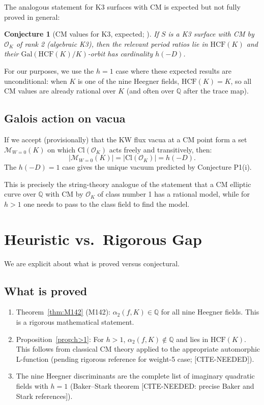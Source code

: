 \documentclass[12pt,a4paper]{article}
\theoremstyle{plain}
\newtheorem{conjecture}[theorem]{Conjecture}
\theoremstyle{definition}
\newcommand{\Q}{\mathbb{Q}}
\newcommand{\OK}{\mathcal{O}_K}
\newcommand{\HCF}{\mathrm{HCF}}
\newcommand{\Gal}{\mathrm{Gal}}
\begin{document}
The analogous statement for K3 surfaces with CM is expected but not fully
proved in general:

\begin{conjecture}[CM values for K3, expected; ]
If $S$ is a K3 surface with CM by $\OK$ of rank 2 (algebraic K3), then
the relevant period ratios lie in $\HCF(K)$ and their $\Gal(\HCF(K)/K)$-orbit
has cardinality $h(-D)$.
\end{conjecture}

For our purposes, we use the $h=1$ case where these expected results are
unconditional: when $K$ is one of the nine Heegner fields, $\HCF(K) = K$,
so all CM values are already rational over $K$ (and often over $\Q$ after
the trace map).

\subsection{Galois action on vacua}

If we accept (provisionally) that the KW flux vacua at a CM point form a
set $\mathcal{M}_{W=0}(K)$ on which $\mathrm{Cl}(\OK)$ acts freely and
transitively, then:
\[
  |\mathcal{M}_{W=0}(K)| = |\mathrm{Cl}(\OK)| = h(-D).
\]
The $h(-D) = 1$ case gives the unique vacuum predicted by Conjecture P1(i).

This is precisely the string-theory analogue of the statement that a CM
elliptic curve over $\Q$ with CM by $\OK$ of class number 1 has a rational
model, while for $h > 1$ one needs to pass to the class field to find the
model.

\section{Heuristic vs.\ Rigorous Gap}
\label{sec:gap}

We are explicit about what is proved versus conjectural.

\subsection{What is proved}

\begin{enumerate}
  \item Theorem~\ref{thm:M142} (M142): $\alpha_2(f,K) \in \Q$ for all nine
    Heegner fields. This is a rigorous mathematical statement.
  \item Proposition~\ref{prop:h>1}: For $h > 1$, $\alpha_2(f,K) \notin \Q$
    and lies in $\HCF(K)$. This follows from classical CM theory applied
    to the appropriate automorphic L-function (pending rigorous reference
    for weight-5 case; [CITE-NEEDED]).
  \item The nine Heegner discriminants are the complete list of imaginary
    quadratic fields with $h=1$ (Baker--Stark theorem \cite{Baker1966,Stark1967}
    [CITE-NEEDED: precise Baker and Stark references]).
\end{enumerate}
\end{document}
